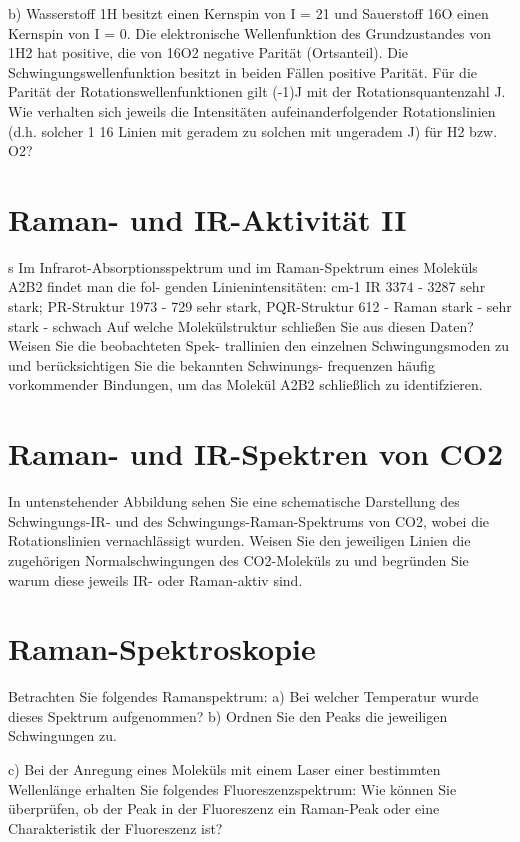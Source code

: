 b) Wasserstoff 1H besitzt einen Kernspin von I = 21 und Sauerstoff 16O einen Kernspin von I =
0. Die elektronische Wellenfunktion des Grundzustandes von 1H2 hat positive, die von 16O2
negative Parität (Ortsanteil). Die Schwingungswellenfunktion besitzt in beiden Fällen positive
Parität. Für die Parität der Rotationswellenfunktionen gilt (-1)J mit der Rotationsquantenzahl
  J. Wie verhalten sich jeweils die Intensitäten aufeinanderfolgender Rotationslinien (d.h. solcher 1 16
Linien mit geradem zu solchen mit ungeradem J) für H2 bzw. O2?


\section{Raman- und IR-Aktivität II}
s
 Im Infrarot-Absorptionsspektrum und im Raman-Spektrum eines Moleküls A2B2 findet man die fol- genden Linienintensitäten:
 cm-1 IR
3374 -
3287 sehr stark; PR-Struktur 1973 -
729 sehr stark, PQR-Struktur 612 -
Raman stark
-
sehr stark -
schwach
  Auf welche Molekülstruktur schließen Sie aus diesen Daten? Weisen Sie die beobachteten Spek- trallinien den einzelnen Schwingungsmoden zu und berücksichtigen Sie die bekannten Schwinungs- frequenzen häufig vorkommender Bindungen, um das Molekül A2B2 schließlich zu identifzieren.


\section{Raman- und IR-Spektren von CO2}

In untenstehender Abbildung sehen Sie eine schematische Darstellung des Schwingungs-IR- und des Schwingungs-Raman-Spektrums von CO2, wobei die Rotationslinien vernachlässigt wurden. Weisen Sie den jeweiligen Linien die zugehörigen Normalschwingungen des CO2-Moleküls zu und begründen Sie warum diese jeweils IR- oder Raman-aktiv sind.


\section{Raman-Spektroskopie}
Betrachten Sie folgendes Ramanspektrum:
a) Bei welcher Temperatur wurde dieses Spektrum aufgenommen? b) Ordnen Sie den Peaks die jeweiligen Schwingungen zu.
 
c) Bei der Anregung eines Moleküls mit einem Laser einer bestimmten Wellenlänge erhalten Sie folgendes Fluoreszenzspektrum:
 Wie können Sie überprüfen, ob der Peak in der Fluoreszenz ein Raman-Peak oder eine Charakteristik der Fluoreszenz ist?